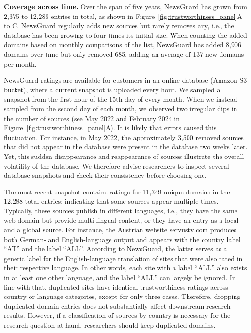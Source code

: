 \documentclass[12pt,twoside]{article}
\begin{document}
\textbf{Coverage across time.} 
Over the span of five years, NewsGuard has grown from 2,375 to 12,288 entries in total, as shown in Figure~\ref{fig:trustworthiness_panel}A to C. 
NewsGuard regularly adds new sources but rarely removes any, i.e., the database has been growing to four times its initial size. 
When counting the added domains based on monthly comparisons of the list, NewsGuard has added 8,906 domains over time but only removed 685, adding an average of 137 new domains per month.

NewsGuard ratings are available for customers in an online database (Amazon S3 bucket), where a current snapshot is uploaded every hour. 
We sampled a snapshot from the first hour of the 15th day of every month. 
When we instead sampled from the second day of each month, we observed two irregular dips in the number of sources (see May 2022 and February 2024 in Figure~\ref{fig:trustworthiness_panel}A). 
It is likely that errors caused this fluctuation. 
For instance, in May 2022, the approximately 3,500 removed sources that did not appear in the database were present in the database two weeks later.
Yet, this sudden disappearance and reappearance of sources illustrate the overall volatility of the database. 
We therefore advise researchers to inspect several database snapshots and check their consistency before choosing one. 

The most recent snapshot contains ratings for 11,349 unique domains in the 12,288 total entries; indicating that some sources appear multiple times. 
Typically, these sources publish in different languages, i.e., they have the same web domain but provide multi-lingual content, or they have an entry as a local and a global source. 
For instance, the Austrian website servustv.com produces both German- and English-language output and appears with the country label ``AT'' and the label ``ALL''. 
According to NewsGuard, the latter serves as a generic label for the English-language translation of sites that were also rated in their respective language. 
In other words, each site with a label ``ALL'' also exists in at least one other language, and the label ``ALL'' can largely be ignored.
In line with that, duplicated sites have identical trustworthiness ratings across country or language categories, except for only three cases. 
Therefore, dropping duplicated domain entries does not substantially affect downstream research results. 
However, if a classification of sources by country is necessary for the research question at hand, researchers should keep duplicated domains. 
\end{document}
